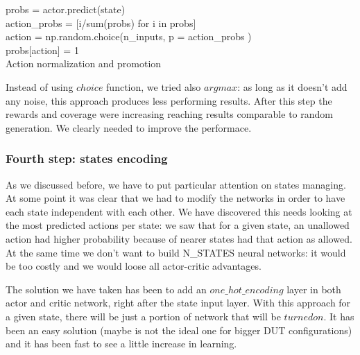 \documentclass{article}
\begin{document}
\begin{algorithm}[H]
probs = actor.predict(state) \\
action\_probs = [i/sum(probs) for i in probs] \\
action = np.random.choice(n\_inputs, p = action\_probs ) \\
probs[action] = 1 \\
 \caption{Action normalization and promotion}
 \label{action}
\end{algorithm}

Instead of using $choice$ function, we tried also $argmax$: as long as it doesn't add any noise, this approach produces less performing results. After this step the rewards and coverage were increasing reaching results comparable to random generation. We clearly needed to improve the performace.

\subsubsection*{Fourth step: states encoding}
As we discussed before, we have to put particular attention on states managing. At some point it was clear that we had to modify the networks in order to have each state independent with each other. We have discovered this needs looking at the most predicted actions per state: we saw that for a given state, an unallowed action had higher probability because of nearer states had that action as allowed. At the same time we don't want to build N\_STATES neural networks: it would be too costly and we would loose all actor-critic advantages.

The solution we have taken has been to add an $one\_hot\_encoding$ layer in both actor and critic network, right after the state input layer. With this approach for a given state, there will be just a portion of network that will be $turned on$. It has been an easy solution (maybe is not the ideal one for bigger DUT configurations) and it has been fast to see a little increase in learning.
\end{document}
